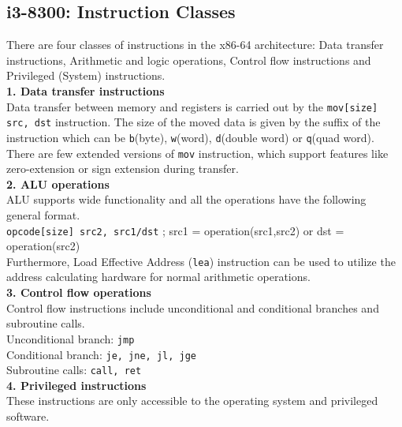 \documentclass[a4paper,11pt]{article}
\begin{document}
\subsection{i3-8300: Instruction Classes}
There are four classes of instructions in the x86-64 architecture: Data transfer instructions, Arithmetic and logic operations, Control flow instructions and Privileged (System) instructions.\\
\textbf{1. Data transfer instructions}\\
Data transfer between memory and registers is carried out by the {\tt mov[size] src, dst} instruction. The size of the moved data is given by the suffix of the instruction which can be {\tt b}(byte), {\tt w}(word), {\tt d}(double word) or {\tt q}(quad word). There are few extended versions of {\tt mov} instruction, which support features like zero-extension or sign extension during transfer.\\
\textbf{2. ALU operations}\\
ALU supports wide functionality and all the operations have the following general format.\\
{\tt opcode[size] src2, src1/dst} ; src1 = operation(src1,src2) or dst = operation(src2)\\
Furthermore, Load Effective Address ({\tt lea}) instruction can be used to utilize the address calculating hardware for normal arithmetic operations.\\
\textbf{3. Control flow operations}\\
Control flow instructions include unconditional and conditional branches and subroutine calls.\\
Unconditional branch: {\tt jmp}\\
Conditional branch: {\tt je, jne, jl, jge}\\
Subroutine calls: {\tt call, ret}\\
\textbf{4. Privileged instructions}\\
These instructions are only accessible to the operating system and privileged software.
\end{document}
